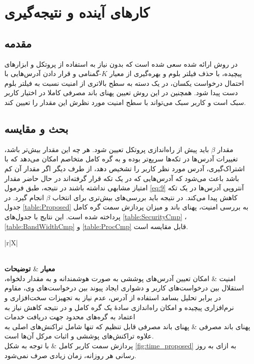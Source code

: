 \chapter{کار‌های آینده و نتیجه‌گیری}
\label{chap:results}
\section{مقدمه} 
در روش ارائه شده سعی شده است که بدون نیاز به استفاده از پروتکل و ابزار‌های پیچیده، با حذف فیلتر بلوم و بهره‌گیری از معیار ‌$K$-گمنامی و قرار دادن آدرس‌هایی با احتمال درخواست یکسان، در یک دسته به سطح بالاتری از امنیت نسبت به فیلتر بلوم دست پیدا شود. همچنین در این روش تعیین پهنای باند مصرفی کاملا در اختیار کاربر سبک است و کاربر سبک می‌تواند با سطح امنیت مورد نظرش این مقدار را تعیین کند.

\section{بحث و مقایسه} 
مقدار $\beta$ باید پیش از راه‌اندازی پروتکل تعیین شود. هر چه این مقدار بیش‌تر باشد، تغییرات آدرس‌ها در تکه‌ها سریع‌تر بوده و به گره کامل متخاصم امکان می‌دهد که با اشتراک‌گیری، آدرس مورد نظر کاربر را تشخیص دهد، از طرف دیگر اگر مقدار آن کم باشد باعث می‌شود که آدرس‌هایی که در یک تکه قرار گرفته‌اند در حال حاضر مقدار امتیاز مشابهی نداشته باشند در نتیجه، طبق فرمول \eqref{eq:9} آنتروپی آدرس‌ها در یک تکه کاهش پیدا می‌کند. در نتیجه باید بررسی‌های بیش‌تری برای انتخاب $\beta$ انجام گیرد. در جدول \ref{table:Proposed} به بررسی امنیت، پهنای باند و میزان پردازش سمت گره کامل پرداخته شده است. این نتایج با جدول‌های \ref{table:SecurityCmp} ،\ref{table:BandWidthCmp} و \ref{table:ProcCmp} قابل مقایسه است.

\begin{xltabular}{\textwidth}{|r|X|}
	\caption{
		بررسی  امنیت، پهنای باند و پردازش سمت گره کامل برای روش ارائه شده
		\label{table:Proposed}}\\
	\hline
	\textbf{معیار} & \textbf{توضیحات} \\
	\hline
	{%
		امنیت
	}&{%
		امکان تعیین آدرس‌های پوششی به صورت هوشمندانه و به مقدار دلخواه، استقلال بین درخواست‌های کاربر و دشواری ایجاد پیوند بین درخواست‌های وی، مقاوم در برابر تحلیل بسامد استفاده از آدرس، عدم نیاز به تجهیزات سخت‌افزاری و نرم‌افزاری پیچیده و امکان راه‌اندازی ساده‌ٔ یک گره کامل و در نتیجه کاهش نیاز به اعتماد به گره‌های محدود جهت دریافت خدمات
	}\\
	\hline
	{%
		پهنای باند مصرفی
	}&{%
		پهنای باند مصرفی قابل تنظیم که تنها شامل تراکنش‌های اصلی به علاوه تراکنش‌های پوششی و اثبات مرکل آن‌ها است.
	}\\
	\hline
	{%
		پردازش سمت کاربر کامل
	} & {%
		با توجه به شکل \ref{fig:time_proposed} به ازای به روز رسانی هر روزانه، زمان زیادی صرف نمی‌شود.
	}\\
	\hline
	
\end{xltabular}
